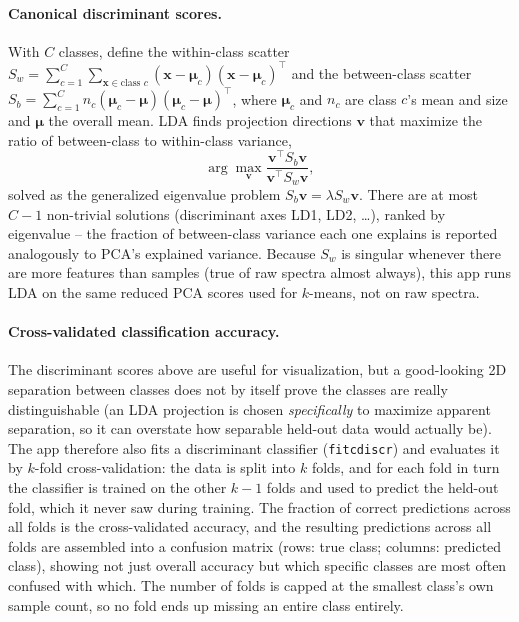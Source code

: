 \documentclass[11pt,a4paper]{article}
\newcommand{\code}[1]{\texttt{#1}}
\begin{document}
\paragraph{Canonical discriminant scores.} With $C$ classes, define the
within-class scatter $S_w = \sum_{c=1}^{C}\sum_{\mathbf{x}\in
\text{class }c}(\mathbf{x}-\boldsymbol\mu_c)(\mathbf{x}-\boldsymbol\mu_c)^\top$
and the between-class scatter $S_b = \sum_{c=1}^C n_c
(\boldsymbol\mu_c-\boldsymbol\mu)(\boldsymbol\mu_c-\boldsymbol\mu)^\top$,
where $\boldsymbol\mu_c$ and $n_c$ are class $c$'s mean and size and
$\boldsymbol\mu$ the overall mean. LDA finds projection directions
$\mathbf{v}$ that maximize the ratio of between-class to within-class
variance,
\[
  \arg\max_{\mathbf v} \frac{\mathbf{v}^\top S_b \mathbf{v}}
                             {\mathbf{v}^\top S_w \mathbf{v}} ,
\]
solved as the generalized eigenvalue problem $S_b\mathbf{v} =
\lambda S_w \mathbf{v}$. There are at most $C-1$ non-trivial solutions
(discriminant axes LD1, LD2, \dots), ranked by eigenvalue -- the fraction of
between-class variance each one explains is reported analogously to PCA's
explained variance. Because $S_w$ is singular whenever there are more
features than samples (true of raw spectra almost always), this app runs
LDA on the same reduced PCA scores used for $k$-means, not on raw spectra.

\paragraph{Cross-validated classification accuracy.} The discriminant
scores above are useful for visualization, but a good-looking 2D separation
between classes does not by itself prove the classes are really
distinguishable (an LDA projection is chosen \emph{specifically} to
maximize apparent separation, so it can overstate how separable held-out
data would actually be). The app therefore also fits a discriminant
classifier (\code{fitcdiscr}) and evaluates it by $k$-fold cross-validation:
the data is split into $k$ folds, and for each fold in turn the classifier
is trained on the other $k-1$ folds and used to predict the held-out fold,
which it never saw during training. The fraction of correct predictions
across all folds is the cross-validated accuracy, and the resulting
predictions across all folds are assembled into a confusion matrix (rows:
true class; columns: predicted class), showing not just overall accuracy
but which specific classes are most often confused with which. The number
of folds is capped at the smallest class's own sample count, so no fold
ends up missing an entire class entirely.
\end{document}
